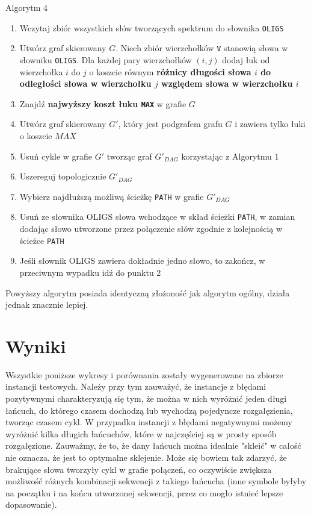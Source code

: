 \documentclass[a4paper,10pt]{article}
\begin{document}
Algorytm 4
\begin{enumerate}
 \item Wczytaj zbiór wszystkich słów tworzących spektrum do słownika \texttt{OLIGS}
 \item Utwórz graf skierowany $G$. Niech zbiór wierzchołków \texttt{V} stanowią słowa w słowniku \texttt{OLIGS}. 
       Dla każdej pary wierzchołków $(i,j)$ dodaj łuk od wierzchołka $i$ do $j$ o koszcie równym 
       {\bf różnicy długości słowa $i$ do odległości słowa w wierzchołku $j$ względem słowa w wierzchołku $i$}
 \item Znajdź {\bf najwyższy koszt łuku \texttt{MAX}} w grafie $G$
 \item Utwórz graf skierowany $G'$, który jest podgrafem grafu $G$ i zawiera tylko łuki o koszcie $MAX$
 \item Usuń cykle w grafie $G'$ tworząc graf $G'_{DAG}$ korzystając z Algorytmu 1
 \item Uszereguj topologicznie $G'_{DAG}$
 \item Wybierz najdłuższą możliwą ścieżkę \texttt{PATH} w grafie $G'_{DAG}$
 \item Usuń ze słownika OLIGS słowa wchodzące w skład ścieżki \texttt{PATH}, w zamian dodając słowo utworzone przez połączenie słów zgodnie z kolejnością w ścieżce \texttt{PATH}
 \item Jeśli słownik OLIGS zawiera dokładnie jedno słowo, to zakończ, w przeciwnym wypadku idź do punktu 2
\end{enumerate}

Powyższy algorytm posiada identyczną złożoność jak algorytm ogólny, działa jednak znacznie lepiej.

\section{Wyniki}

Wszystkie poniższe wykresy i porównania zostały wygenerowane na zbiorze instancji testowych. Należy przy tym zauważyć, że instancje z błędami pozytywnymi charakteryzują się tym, że można w nich wyróżnić jeden długi łańcuch, do którego czasem dochodzą lub wychodzą pojedyncze rozgałęzienia, tworząc czasem cykl. W przypadku instancji z błędami negatywnymi możemy wyróżnić kilka długich łańcuchów, które w najczęściej są w prosty sposób rozgałęzione. Zauważmy, że to, że dany łańcuch można idealnie "skleić" w całość nie oznacza, że jest to optymalne sklejenie. Może się bowiem tak zdarzyć, że brakujące słowa tworzyły cykl w grafie połączeń, co oczywiście zwiększa możliwość różnych kombinacji sekwencji z takiego łańcucha (inne symbole byłyby na początku i na końcu utworzonej sekwencji, przez co mogło istnieć lepsze dopasowanie).
\end{document}
